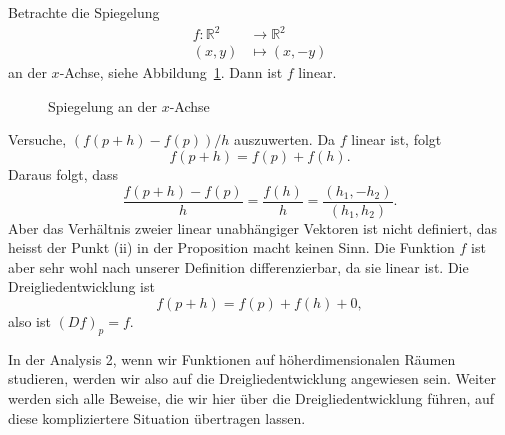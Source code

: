 \documentclass[../main.tex]{subfiles}
\begin{document}
\begin{example}
  Betrachte die Spiegelung
  \begin{align*}
    f \colon \mathbb{R}^2 & \to \mathbb{R}^2 \\
    (x, y) & \mapsto (x, -y)
  \end{align*}
  an der $x$-Achse, siehe
  Abbildung~\ref{fig:reflection}. Dann ist $f$ linear.

\begin{figure}[htb]
  \centering
  
  \caption{Spiegelung an der $x$-Achse}%
  \label{fig:reflection}
\end{figure}

  Versuche,
$(f(p + h) - f(p))/h$
auszuwerten. Da $f$ linear ist, folgt
\[
  f(p + h) = f(p) + f(h).
\]
Daraus folgt, 
dass
\[
  \frac{f(p+h) - f(p)}{h} = \frac{f(h)}{h}
  = \frac{(h_1, -h_2)}{(h_1, h_2)}.
\]
Aber das Verhältnis zweier linear unabhängiger
Vektoren ist nicht definiert,
das heisst der Punkt (ii) in der Proposition
macht keinen Sinn.
Die Funktion $f$ ist aber sehr wohl
nach unserer Definition differenzierbar,
da sie linear ist. Die Dreigliedentwicklung
ist
\[
  f(p + h) = f(p) + f(h) + 0,
\]
also ist ${(Df)}_p = f$.

In der Analysis 2, wenn wir Funktionen
auf höherdimensionalen Räumen
studieren, werden wir also auf
die Dreigliedentwicklung angewiesen sein.
Weiter werden sich alle Beweise, die wir
hier über die Dreigliedentwicklung führen,
auf diese kompliziertere Situation
übertragen lassen.
\end{example}
\end{document}

